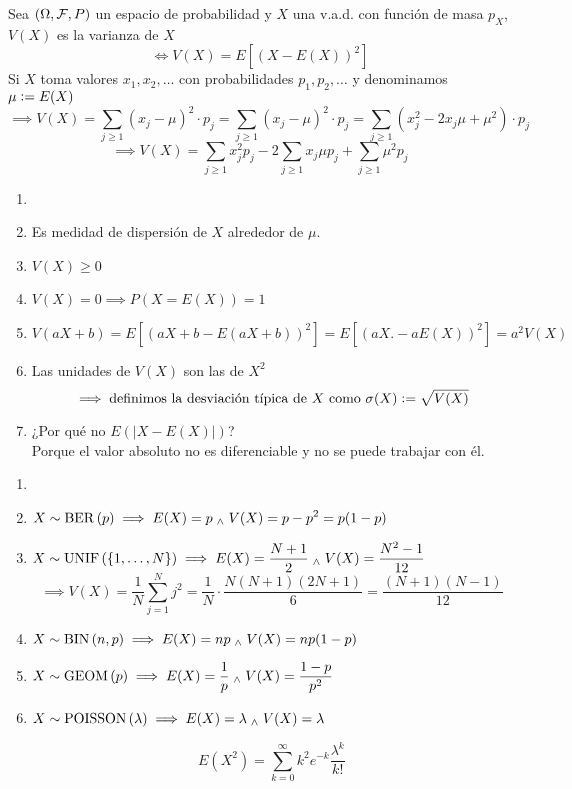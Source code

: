 \begin{defn}
	Sea $(\Omega, \mathcal{F}, P)$ un espacio de probabilidad y $X$ una v.a.d. con función de masa $p_X$, $V(X)$ es la varianza de $X$
	\[\iff V(X)=E\left[(X-E(X))^2\right]\] 
	Si $X$ toma valores $x_1, x_2, \dots$ con probabilidades $p_1, p_2, \dots$ y denominamos $\mu \vcentcolon= E(X)$
	\[\implies V(X)=\sum_{j\geq 1}(x_j-\mu)^2\cdot p_j = \sum_{j\geq 1}(x_j-\mu)^2\cdot p_j = \sum_{j\geq 1}(x_j^2-2x_j\mu+\mu^2)\cdot p_j\]
	\[\implies V(X)=\sum_{j\geq 1}x_j^2p_j -2\sum_{j\geq 1}x_j\mu p_j +\sum_{j\geq 1}\mu^2p_j\]
\end{defn}

\begin{obs}
	\begin{enumerate}
		\item[] 
		\item Es medidad de dispersión de $X$ alrededor de $\mu$.
		\item $V(X)\geq 0$
		\item $V(X)=0\implies P(X=E(X))=1$
		\item $V(aX+b)=E[(aX+b-E(aX+b))^2]=E[(aX.-aE(X))^2]=a^2V(X)$
		\item Las unidades de $V(X)$ son las de $X^2$ $$\implies \text{definimos la desviación típica de $X$ como } \sigma(X)\vcentcolon=\sqrt{V(X)}$$
		\item ¿Por qué no $E(|X-E(X)|)$? \\
		Porque el valor absoluto no es diferenciable y no se puede trabajar con él.
	\end{enumerate}
\end{obs}

\begin{ejem}
	\begin{enumerate}
		\item[]
		\item $\displaystyle X\sim\operatorname{BER}\left(p\right) \implies E(X)=p \; _{\wedge} \; V(X)=p-p^2=p(1-p)$
		\item $\displaystyle X\sim \operatorname{UNIF}\left(\{1, \dots, N\}\right) \implies E(X)=\frac{N+1}{2} \; _{\wedge} \; V(X)=\frac{N^2-1}{12}$
		\[\implies V(X)=\frac{1}{N}\sum_{j=1}^N j^2=\frac{1}{N}\cdot\frac{N(N+1)(2N+1)}{6}=\frac{(N+1)(N-1)}{12}\]
		\item $\displaystyle X\sim\operatorname{BIN}\left(n, p\right) \implies E(X)=np \; _{\wedge} \; V(X)=np(1-p)$
		\begin{dem}
			
		\end{dem}
		\item $\displaystyle X\sim\operatorname{GEOM}\left(p\right) \implies E(X)=\frac{1}{p} \; _{\wedge} \; V(X)=\frac{1-p}{p^2}$
		\begin{dem}
			
		\end{dem}
		\item $X\sim\operatorname{POISSON}\left(\lambda\right) \implies E(X)=\lambda \; _{\wedge} \; V(X)=\lambda$
		\begin{dem}
			\[E(X^2)=\sum_{k=0}^{\infty} k^2 e^{-k}\frac{\lambda^k}{k!}\]
		\end{dem}
	\end{enumerate}
\end{ejem}

